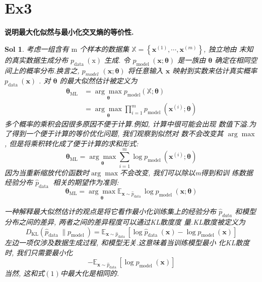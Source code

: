 \documentclass[UTF8,a4paper,11pt]{ctexart}
\newtheorem{sol}{Sol}[section]
\begin{document}
\section{Ex3}
\textbf{说明最大化似然与最小化交叉熵的等价性.}
\begin{sol}
	
	考虑一组含有 $\mathrm{m}$ 个样本的数据集 $\mathbb{X}=\left\{\boldsymbol{x}^{(1)}, \cdots, \boldsymbol{x}^{(m)}\right\}$, 独立地由 末知的真实数据生成分布 $p_{\text {data }}(\mathrm{x})$ 生成.
	令 $p_{\text {model }}(\mathbf{x} ; \boldsymbol{\theta})$ 是一族由 $\boldsymbol{\theta}$ 确定在相同空间上的概率分布.换言之, $p_{model}$ $(\boldsymbol{x} ; \boldsymbol{\theta})$ 将任意输入 $\boldsymbol{x}$ 映射到实数来估计真实概率 $p_{\text {data }}(\boldsymbol{x})$ .
	对 $\boldsymbol{\theta}$ 的最大似然估计被定义为
	$$
	\begin{aligned}
		\boldsymbol{\theta}_{\mathrm{ML}} &=\underset{\boldsymbol{\theta}}{\arg \max } p_{\mathrm{model}}(\mathbb{X} ; \boldsymbol{\theta}) \\
		&=\underset{\boldsymbol{\theta}}{\arg \max } \prod_{i=1}^{m} p_{\text {model }}\left(\boldsymbol{x}^{(i)} ; \boldsymbol{\theta}\right)
	\end{aligned}
	$$
	多个概率的乘积会因很多原因不便于计算.例如, 计算中很可能会出现 数值下溢.为了得到一个便于计算的等价优化问题, 我们观察到似然对 数不会改变其 $\arg \max$, 但是将乘积转化成了便于计算的求和形式:
	$$
	\boldsymbol{\theta}_{\mathrm{ML}}=\underset{\boldsymbol{\theta}}{\arg \max } \sum_{i=1}^{m} \log p_{\text {model }}\left(\boldsymbol{x}^{(i)} ; \boldsymbol{\theta}\right)
	$$
	因为当重新缩放代价函数时$\arg \max$不会改变, 我们可以除以m得到和训 练数据经验分布 $\hat{p}_{\text {data }}$ 相关的期望作为准则:
	\begin{equation}
		\boldsymbol{\theta}_{\mathrm{ML}}=\underset{\boldsymbol{\theta}}{\arg \max } \mathbb{E}_{\mathbf{x} \sim \hat{p}_{\text {data }}} \log p_{\text {model }}(\boldsymbol{x} ; \boldsymbol{\theta})
	\end{equation}
	
	
	一种解释最大似然估计的观点是将它看作最小化训练集上的经验分布 $\hat{p}_{data}$ 和模型分布之间的差异, 两者之间的差异程度可以通过KL散度度 量.KL散度被定义为
	$$
	D_{\mathrm{KL}}\left(\hat{p}_{\text {data }} \| p_{\text {model }}\right)=\mathbb{E}_{\mathbf{x} \sim \hat{p}_{\text {data }}}\left[\log \hat{p}_{\text {data }}(\boldsymbol{x})-\log p_{\text {model }}(\boldsymbol{x})\right]
	$$
	左边一项仅涉及数据生成过程, 和模型无关.这意味着当训练模型最小 化KL散度时, 我们只需要最小化
	$$
	-\mathbb{E}_{\mathbf{x} \sim \hat{p}_{\text {data }}}\left[\log p_{\text {model }}(\boldsymbol{x})\right]
	$$
	当然, 这和式$(1)$中最大化是相同的.
\end{sol}
\end{document}
